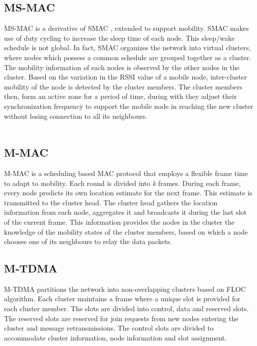\documentclass[a4paper, conference, 10pt]{IEEEtran}
\begin{document}
{ \color{blue}
\subsection{MS-MAC}
 MS-MAC \cite{ms-mac} is a derivative of SMAC \cite{smac}, extended to support mobility. SMAC makes use of duty cycling to increase the sleep time of each node. This sleep/wake schedule is not global. In fact, SMAC organizes the network into virtual clusters, where nodes which possess a common schedule are grouped together as a cluster. The mobility information of each nodes is observed by the other nodes in the cluster. Based on the variation in the RSSI value of a mobile node, inter-cluster mobility of the node is detected by the cluster members. The cluster members then, form an active zone for a period of time, during with they adjust their synchronization frequency to support the mobile node in reaching the new cluster without losing connection to all its neighbours. \\\\

\subsection{M-MAC}
M-MAC \cite{m-mac} is a scheduling based MAC protocol that employs a flexible frame time to adapt to mobility. Each round is divided into \emph{k} frames. During each frame, every node predicts its own location estimate for the next frame. This estimate is transmitted to the cluster head. The cluster head gathers the location information from each node, aggregates it and broadcasts it during the last slot of the current frame. This information provides the nodes in the cluster the knowledge of the mobility states of the cluster members, based on which a node chooses one of its neighbours to relay the data packets.

\subsection{M-TDMA}
M-TDMA \cite{m-tdma} partitions the network into non-overlapping clusters based on FLOC algorithm\cite{floc}. Each cluster maintains a frame where a unique slot is provided for each cluster member. The slots are divided into control, data and reserved slots. The reserved slots are reserved for join requests from new nodes entering the cluster and message retransmissions. The control slots are divided to accommodate cluster information, node information and slot assignment. 

}
\end{document}
